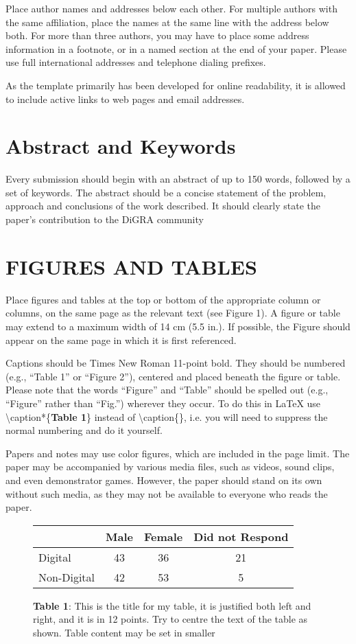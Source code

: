 \documentclass[11pt]{article}
\begin{document}
Place author names and addresses below each other. For multiple
authors with the same affiliation, place the names at the same line with the address below
both. For more than three authors, you may have to place some address information in a
footnote, or in a named section at the end of your paper. Please use full international
addresses and telephone dialing prefixes.

As the template primarily has been developed for online readability, it is allowed to
include active links to web pages and email addresses.
\section*{Abstract and Keywords}
Every submission should begin with an abstract of up to 150 words, followed by a set of
keywords. The abstract should be a concise statement of the problem, approach and
conclusions of the work described. It should clearly state the paper's contribution to the
DiGRA community
\section*{FIGURES AND TABLES}
Place figures and tables at the top or bottom of the appropriate column or columns, on the
same page as the relevant text (see Figure 1). A figure or table may extend to a maximum
width of 14 cm (5.5 in.). If possible, the Figure should appear on the same page in which
it is first referenced.

Captions should be Times New Roman 11-point bold. They should be numbered (e.g.,
``Table 1'' or ``Figure 2''), centered and placed beneath the figure or table. Please note that
the words ``Figure'' and ``Table'' should be spelled out (e.g., ``Figure'' rather than ``Fig.'')
wherever they occur.  To do this in LaTeX use \textbackslash  caption*\{\textbf{Table 1}\} instead of  \textbackslash  caption\{\}, i.e. you will need to suppress the normal numbering and do it yourself.

Papers and notes may use color figures, which are included in the page limit. The paper
may be accompanied by various media files, such as videos, sound clips, and even
demonstrator games. However, the paper should stand on its own without such media, as
they may not be available to everyone who reads the paper.
\begin{figure}[h]
\centering
\begin{tabular}{| l | c | c | c |}
\hline
  & \textbf{Male} & \textbf{Female} & \textbf{Did not Respond} \\
  \hline
Digital &43 &36 &21\\
\hline
Non-Digital &42 &53 &5 \\
\hline
\end{tabular}
\caption*{\textbf{Table 1}: This is the title for my table, it is justified both left and right, and it is in 12
points. Try to centre the text of the table as shown. Table content may be set in smaller}
\end{figure}
\end{document}
